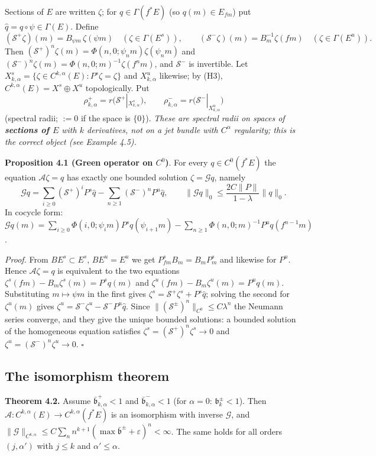 \documentclass[11pt,a4paper]{article}
\theoremstyle{plain}
\theoremstyle{definition}
\theoremstyle{remark}
\numberwithin{equation}{section}
\numberwithin{figure}{section}
\begin{document}
Sections of $E$ are written $\zeta$; for $q\in\Gamma(f^*E)$ (so $q(m)\in E_{fm}$) put $\hat q=q\circ\psi\in\Gamma(E)$. Define
\[
(\mathcal S^+\zeta)(m)=B_{\psi m}\,\zeta(\psi m)\quad(\zeta\in\Gamma(E^s)),\qquad(\mathcal S^-\zeta)(m)=B_m^{-1}\zeta(fm)\quad(\zeta\in\Gamma(E^u)).
\]
Then $(\mathcal S^+)^n\zeta(m)=\Phi(n,0;\psi_nm)\zeta(\psi_nm)$ and $(\mathcal S^-)^n\zeta(m)=\Phi(n,0;m)^{-1}\zeta(f^nm)$, and $\mathcal S^-$ is invertible. Let $X^s_{k,\alpha}=\{\zeta\in C^{k,\alpha}(E):P^s\zeta=\zeta\}$ and $X^u_{k,\alpha}$ likewise; by (H3), $C^{k,\alpha}(E)=X^s\oplus X^u$ topologically. Put
\[
\rho^+_{k,\alpha}=r\big(\mathcal S^+|_{X^s_{k,\alpha}}\big),\qquad\rho^-_{k,\alpha}=r\big(\mathcal S^-|_{X^u_{k,\alpha}}\big)
\]
(spectral radii; $:=0$ if the space is $\{0\}$). \textit{These are spectral radii on spaces of \textbf{sections of $E$} with $k$ derivatives, not on a jet bundle with $C^\alpha$ regularity; this is the correct object (see Example 4.5).}

\textbf{Proposition 4.1 (Green operator on $C^0$)}. For every $q\in C^0(f^*E)$ the equation $\mathcal A\zeta=q$ has exactly one bounded solution $\zeta=\mathcal Gq$, namely
\[
\mathcal Gq=\sum_{i\ge0}(\mathcal S^+)^iP^s\hat q-\sum_{n\ge1}(\mathcal S^-)^nP^u\hat q,\qquad\|\mathcal Gq\|_0\le\frac{2C\|P\|}{1-\lambda}\|q\|_0 .
\]
In cocycle form: $\mathcal Gq(m)=\sum_{i\ge0}\Phi(i,0;\psi_im)P^sq(\psi_{i+1}m)-\sum_{n\ge1}\Phi(n,0;m)^{-1}P^uq(f^{n-1}m)$.

\textit{Proof.} From $BE^s\subset E^s$, $BE^u=E^u$ we get $P^s_{fm}B_m=B_mP^s_m$ and likewise for $P^u$. Hence $\mathcal A\zeta=q$ is equivalent to the two equations $\zeta^s(fm)-B_m\zeta^s(m)=P^sq(m)$ and $\zeta^u(fm)-B_m\zeta^u(m)=P^uq(m)$. Substituting $m\mapsto\psi m$ in the first gives $\zeta^s=\mathcal S^+\zeta^s+P^s\hat q$; solving the second for $\zeta^u(m)$ gives $\zeta^u=\mathcal S^-\zeta^u-\mathcal S^-P^u\hat q$. Since $\|(\mathcal S^\pm)^n\|_{C^0}\le C\lambda^n$ the Neumann series converge, and they give the unique bounded solutions: a bounded solution of the homogeneous equation satisfies $\zeta^s=(\mathcal S^+)^n\zeta^s\to0$ and $\zeta^u=(\mathcal S^-)^n\zeta^u\to0$. $\square$

\subsection{The isomorphism theorem}

\textbf{Theorem 4.2.} Assume $\bar{\mathfrak b}^+_{k,\alpha}<1$ and $\bar{\mathfrak b}^-_{k,\alpha}<1$ (for $\alpha=0$: $\mathfrak b^\pm_k<1$). Then $\mathcal A:C^{k,\alpha}(E)\to C^{k,\alpha}(f^*E)$ is an isomorphism with inverse $\mathcal G$, and $\|\mathcal G\|_{C^{k,\alpha}}\le C\sum_nn^{k+1}(\max\bar{\mathfrak b}^\pm+\varepsilon)^n<\infty$. The same holds for all orders $(j,\alpha')$ with $j\le k$ and $\alpha'\le\alpha$.
\end{document}
